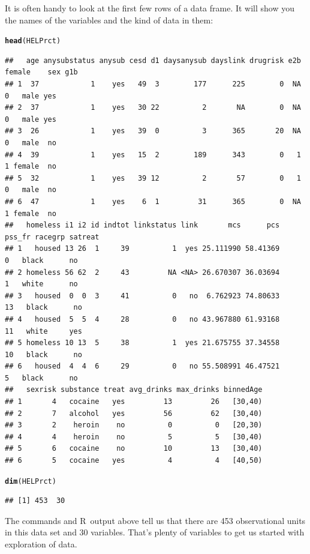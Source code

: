 \documentclass[twoside]{book}\usepackage[]{graphicx}\usepackage[]{xcolor}
\makeatletter
\newcommand{\hlstd}[1]{\textcolor[rgb]{0.345,0.345,0.345}{#1}}%
\newcommand{\hlkwd}[1]{\textcolor[rgb]{0.737,0.353,0.396}{\textbf{#1}}}%
\newenvironment{kframe}{%
 \def\at@end@of@kframe{}%
 \ifinner\ifhmode%
  \def\at@end@of@kframe{\end{minipage}}%
  \begin{minipage}{\columnwidth}%
 \fi\fi%
 \def\FrameCommand##1{\hskip\@totalleftmargin \hskip-\fboxsep
 \colorbox{shadecolor}{##1}\hskip-\fboxsep
     \hskip-\linewidth \hskip-\@totalleftmargin \hskip\columnwidth}%
 \MakeFramed {\advance\hsize-\width
   \@totalleftmargin\z@ \linewidth\hsize
   \@setminipage}}%
 {\par\unskip\endMakeFramed%
 \at@end@of@kframe}
\newenvironment{knitrout}{}{} %
\def\R{{\sf R}}
\makeatother
\begin{document}
It is often handy to look at the first few rows of a data frame.  It will
show you the names of the variables and the kind of data in them:
\begin{knitrout}
\color{fgcolor}\begin{kframe}
\begin{alltt}
\hlkwd{head}\hlstd{(HELPrct)}
\end{alltt}
\begin{verbatim}
##   age anysubstatus anysub cesd d1 daysanysub dayslink drugrisk e2b female    sex g1b
## 1  37            1    yes   49  3        177      225        0  NA      0   male yes
## 2  37            1    yes   30 22          2       NA        0  NA      0   male yes
## 3  26            1    yes   39  0          3      365       20  NA      0   male  no
## 4  39            1    yes   15  2        189      343        0   1      1 female  no
## 5  32            1    yes   39 12          2       57        0   1      0   male  no
## 6  47            1    yes    6  1         31      365        0  NA      1 female  no
##   homeless i1 i2 id indtot linkstatus link       mcs      pcs pss_fr racegrp satreat
## 1   housed 13 26  1     39          1  yes 25.111990 58.41369      0   black      no
## 2 homeless 56 62  2     43         NA <NA> 26.670307 36.03694      1   white      no
## 3   housed  0  0  3     41          0   no  6.762923 74.80633     13   black      no
## 4   housed  5  5  4     28          0   no 43.967880 61.93168     11   white     yes
## 5 homeless 10 13  5     38          1  yes 21.675755 37.34558     10   black      no
## 6   housed  4  4  6     29          0   no 55.508991 46.47521      5   black      no
##   sexrisk substance treat avg_drinks max_drinks binnedAge
## 1       4   cocaine   yes         13         26   [30,40)
## 2       7   alcohol   yes         56         62   [30,40)
## 3       2    heroin    no          0          0   [20,30)
## 4       4    heroin    no          5          5   [30,40)
## 5       6   cocaine    no         10         13   [30,40)
## 6       5   cocaine   yes          4          4   [40,50)
\end{verbatim}
\begin{alltt}
\hlkwd{dim}\hlstd{(HELPrct)}
\end{alltt}
\begin{verbatim}
## [1] 453  30
\end{verbatim}
\end{kframe}
\end{knitrout}
The commands and \R\ output above tell us that there are 453 observational
units in this data set and 30 variables.
That's plenty of variables to get us started with exploration of data.
\end{document}
